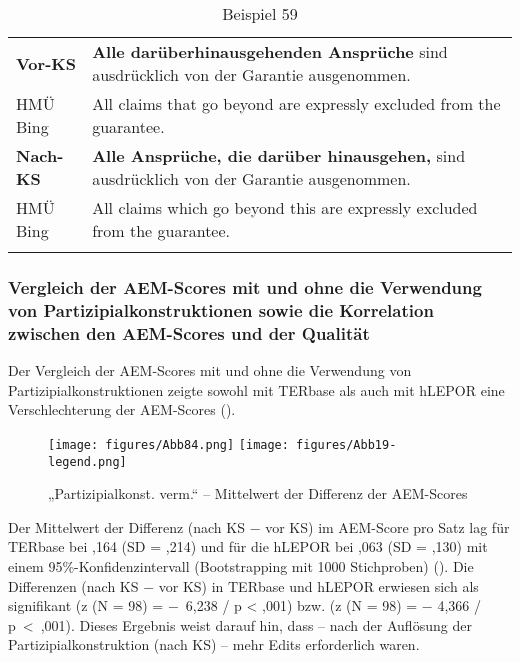 \begin{table}
\begin{tabularx}{\textwidth}{lX}

\lsptoprule

\textbf{Vor-KS} & \textbf{Alle darüberhinausgehenden Ansprüche} sind ausdrücklich von der Garantie ausgenommen.\\
\tablevspace
HMÜ Bing & \textcolor{tmnlpthree}{All claims that go beyond} are expressly excluded from the guarantee.\\
\midrule
\textbf{Nach-KS} & \textbf{Alle Ansprüche, die darüber hinausgehen,} sind ausdrücklich von der Garantie ausgenommen.\\
\tablevspace
HMÜ Bing & \textcolor{tmnlpthree}{All claims which go beyond this} are expressly excluded from the guarantee.\\
\lspbottomrule
\end{tabularx}
\caption{\label{tabex:05:59}Beispiel 59   }
\end{table}

\subsubsection{\label{sec:5.3.5.6}Vergleich der AEM-Scores mit und ohne die Verwendung von Partizipialkonstruktionen sowie die Korrelation zwischen den AEM-Scores und der Qualität}

Der Vergleich der AEM-Scores mit und ohne die Verwendung von Partizipialkonstruktionen zeigte sowohl mit TERbase als auch mit hLEPOR eine Verschlechterung der AEM-Scores ().


\begin{figure}






\texttt{[image: figures/Abb84.png]}
\texttt{[image: figures/Abb19-legend.png]}
\caption{\label{fig:05:84}„Partizipialkonst. verm.“ -- Mittelwert der Differenz der AEM-Scores   }
\end{figure}

Der Mittelwert der Differenz (nach KS $-$ vor KS) im AEM-Score pro Satz lag für TERbase bei ,164 (SD = ,214) und für die hLEPOR bei ,063 (SD = ,130) mit einem 95\%-Konfidenzintervall (Bootstrapping mit 1000 Stichproben) (). Die Differenzen (nach KS $-$ vor KS) in TERbase und hLEPOR erwiesen sich als signifikant (z (N = 98) = $-$~6,238 / p < ,001) bzw. (z (N = 98) = $-$ 4,366 / p~<~,001). Dieses Ergebnis weist darauf hin, dass -- nach der Auflösung der Partizipialkonstruktion (nach KS) -- mehr Edits erforderlich waren.

